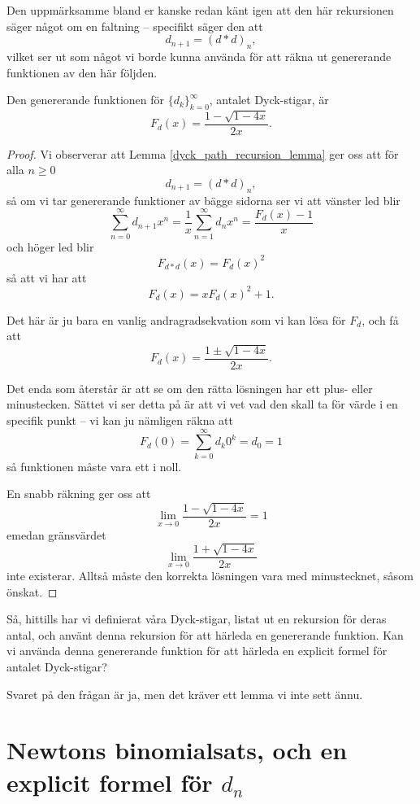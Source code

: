 \documentclass{tufte-handout}
\begin{document}
Den uppmärksamme bland er kanske redan känt igen att den här rekursionen säger något om en faltning -- specifikt säger den att
$$d_{n+1} = (d * d)_n,$$
vilket ser ut som något vi borde kunna använda för att räkna ut genererande funktionen av den här följden.

\begin{proposition}
    Den genererande funktionen för $\{d_k\}_{k=0}^\infty$, antalet Dyck-stigar, är
    $$F_d(x) = \frac{1 - \sqrt{1 - 4x}}{2x}.$$

    \begin{proof}
        Vi observerar att Lemma \ref{dyck_path_recursion_lemma} ger oss att för alla $n \geq 0$
        $$d_{n+1} = (d*d)_n,$$
        så om vi tar genererande funktioner av bägge sidorna ser vi att vänster led blir
        $$\sum_{n=0}^{\infty}d_{n+1}x^n = \frac{1}{x}\sum_{n=1}^{\infty} d_n x^n = \frac{F_d(x) - 1}{x}$$
        och höger led blir
        $$F_{d * d}(x) = F_d(x)^2$$
        så att vi har att
        $$F_d(x) = x F_d(x)^2 + 1.$$

        Det här är ju bara en vanlig andragradsekvation som vi kan lösa för $F_d$, och få att
        $$F_d(x) = \frac{1 \pm \sqrt{1 - 4x}}{2x}.$$

        Det enda som återstår är att se om den rätta lösningen har ett plus- eller minustecken. Sättet vi ser detta på är att vi vet vad den skall ta för värde i en specifik punkt -- vi kan ju nämligen räkna att
        $$F_d(0) = \sum_{k=0}^{\infty} d_k 0^k = d_0 = 1$$
        så funktionen måste vara ett i noll.

        En snabb räkning ger oss att
        $$\lim_{x \to 0} \frac{1 - \sqrt{1 - 4x}}{2x} = 1$$
        emedan gränsvärdet
        $$\lim_{x \to 0} \frac{1 + \sqrt{1 - 4x}}{2x}$$
        inte existerar. Alltså måste den korrekta lösningen vara med minustecknet, såsom önskat.
    \end{proof}
\end{proposition}

Så, hittills har vi definierat våra Dyck-stigar, listat ut en rekursion för deras antal, och använt denna rekursion för att härleda en genererande funktion. Kan vi använda denna genererande funktion för att härleda en explicit formel för antalet Dyck-stigar?

Svaret på den frågan är ja, men det kräver ett lemma vi inte sett ännu.

\section{Newtons binomialsats, och en explicit formel för $d_n$}
\end{document}
